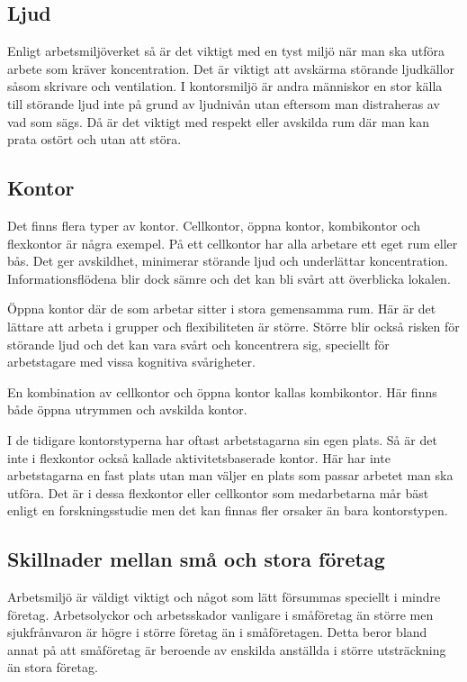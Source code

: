 \subsection{Ljud}
Enligt arbetsmiljöverket så är det viktigt med en tyst miljö när man ska utföra arbete som kräver koncentration. Det är viktigt att avskärma störande ljudkällor såsom skrivare och ventilation. I kontorsmiljö är andra människor en stor källa till störande ljud inte på grund av ljudnivån utan eftersom man distraheras av vad som sägs. Då är det viktigt med respekt eller avskilda rum där man kan prata ostört och utan att störa. \cite{AVLjud}

\subsection{Kontor}
Det finns flera typer av kontor. Cellkontor, öppna kontor, kombikontor och flexkontor är några exempel. På ett cellkontor har alla arbetare ett eget rum eller bås. Det ger avskildhet, minimerar störande ljud och underlättar koncentration. Informationsflödena blir dock sämre och det kan bli svårt att överblicka lokalen.

Öppna kontor där de som arbetar sitter i stora gemensamma rum. Här är det lättare att arbeta i grupper och flexibiliteten är större. Större blir också risken för störande ljud och det kan vara svårt och koncentrera sig, speciellt för arbetstagare med vissa kognitiva svårigheter.

En kombination av cellkontor och öppna kontor kallas kombikontor. Här finns både öppna utrymmen och avskilda kontor.

I de tidigare kontorstyperna har oftast arbetstagarna sin egen plats. Så är det inte i flexkontor också kallade aktivitetsbaserade kontor. Här har inte arbetstagarna en fast plats utan man väljer en plats som passar arbetet man ska utföra. Det är i dessa flexkontor eller cellkontor som medarbetarna mår bäst enligt en forskningsstudie men det kan finnas fler orsaker än bara kontorstypen. \cite{AVKontor}

\subsection{Skillnader mellan små och stora företag}
Arbetsmiljö är väldigt viktigt och något som lätt försummas speciellt i mindre företag. Arbetsolyckor och arbetsskador vanligare i småföretag än större men sjukfrånvaron är högre i större företag än i småföretagen. Detta beror bland annat på att småföretag är beroende av enskilda anställda i större utsträckning än stora företag.\cite{smaforetag}


